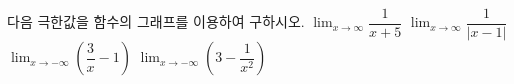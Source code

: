 다음 극한값을 함수의 그래프를 이용하여 구하시오.
 $\displaystyle\lim_{x\to\infty}\dfrac{1}{x+5}$
 $\displaystyle\lim_{x\to\infty}\dfrac{1}{|x-1|}$
 $\displaystyle\lim_{x\to -\infty}\left(\dfrac{3}{x}-1\right)$
 $\displaystyle\lim_{x\to -\infty}\left(3-\dfrac{1}{x^2}\right)$
